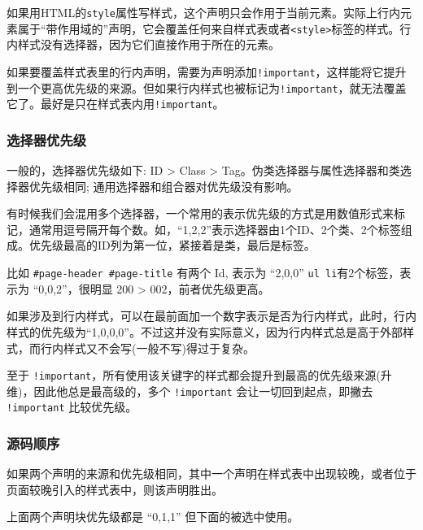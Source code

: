 如果用HTML的\texttt{style}属性写样式，这个声明只会作用于当前元素。实际上行内元素属于“带作用域的”声明，它会覆盖任何来自样式表或者\texttt{<style>}标签的样式。行内样式没有选择器，因为它们直接作用于所在的元素。

如果要覆盖样式表里的行内声明，需要为声明添加\texttt{!important}，这样能将它提升到一个更高优先级的来源。但如果行内样式也被标记为\texttt{!important}，就无法覆盖它了。最好是只在样式表内用\texttt{!important}。

\subsubsection*{选择器优先级}

一般的，选择器优先级如下: ID > Class > Tag。伪类选择器与属性选择器和类选择器优先级相同; 通用选择器和组合器对优先级没有影响。

有时候我们会混用多个选择器，一个常用的表示优先级的方式是用数值形式来标记，通常用逗号隔开每个数。如，“1,2,2”表示选择器由1个ID、2个类、2个标签组成。优先级最高的ID列为第一位，紧接着是类，最后是标签。

比如 \texttt{\#page-header \#page-title} 有两个 Id, 表示为 ``2,0,0'' \texttt{ul li}有2个标签，表示为 ``0,0,2''，很明显 200 > 002，前者优先级更高。

如果涉及到行内样式，可以在最前面加一个数字表示是否为行内样式，此时，行内样式的优先级为“1,0,0,0”。不过这并没有实际意义，因为行内样式总是高于外部样式，而行内样式又不会写(一般不写)得过于复杂。

至于 \texttt{!important}，所有使用该关键字的样式都会提升到最高的优先级来源(升维)，因此他总是最高级的，多个 \texttt{!important} 会让一切回到起点，即撇去 \texttt{!important} 比较优先级。

\subsubsection{源码顺序}

如果两个声明的来源和优先级相同，其中一个声明在样式表中出现较晚，或者位于页面较晚引入的样式表中，则该声明胜出。


上面两个声明块优先级都是 ``0,1,1'' 但下面的被选中使用。

